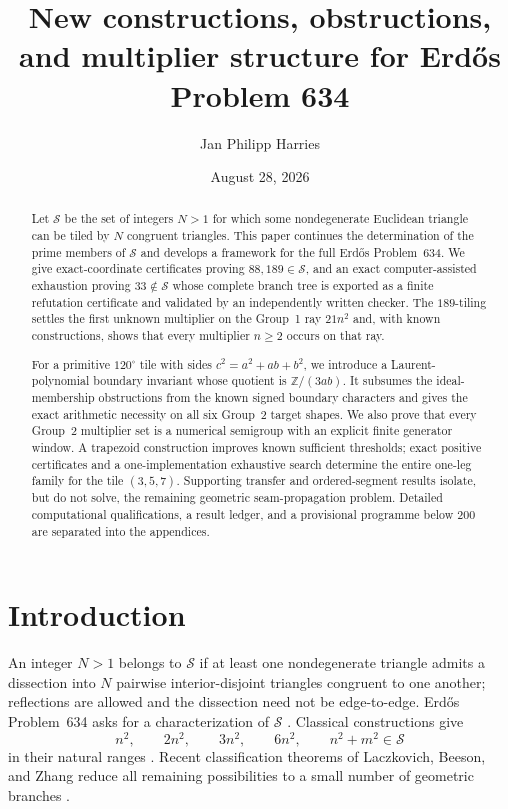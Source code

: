 \documentclass[11pt]{amsart}
\title[Progress toward Erd\H{o}s Problem 634]{New constructions, obstructions, and multiplier
structure for Erd\H{o}s Problem 634}
\author{Jan Philipp Harries}
\date{August 28, 2026}
\theoremstyle{definition}
\theoremstyle{remark}
\newcommand{\Z}{\mathbb Z}
\newcommand{\Sset}{\mathcal S}
\begin{document}
\begin{abstract}
Let $\Sset$ be the set of integers $N>1$ for which some nondegenerate
Euclidean triangle can be tiled by $N$ congruent triangles.  This paper
continues the determination of the prime members of $\Sset$ and develops a
framework for the full Erd\H{o}s Problem~634.  We give exact-coordinate
certificates proving $88,189\in\Sset$, and an
exact computer-assisted exhaustion proving $33\notin\Sset$ whose complete
branch tree is exported as a finite refutation certificate and validated by
an independently written checker.  The $189$-tiling settles the first unknown
multiplier on the Group~1 ray $21n^2$ and, with known constructions, shows that
every multiplier $n\ge2$ occurs on that ray.

For a primitive $120^\circ$ tile with sides
$c^2=a^2+ab+b^2$, we introduce a Laurent-polynomial boundary invariant whose
quotient is $\Z/(3ab)$.  It subsumes the ideal-membership obstructions from
the known signed boundary characters and gives the exact arithmetic necessity
on all six Group~2 target shapes.  We
also prove that every Group~2 multiplier set is a numerical semigroup with an
explicit finite generator window.  A trapezoid construction improves
known sufficient thresholds; exact positive certificates and a
one-implementation exhaustive search determine the entire one-leg family for
the tile $(3,5,7)$.  Supporting transfer and ordered-segment results isolate,
but do not solve, the remaining geometric seam-propagation problem.  Detailed
computational qualifications, a result ledger, and a provisional programme
below $200$ are separated into the appendices.
\end{abstract}

\maketitle

\section{Introduction}\label{sec:intro}

An integer $N>1$ belongs to $\Sset$ if at least one nondegenerate triangle
admits a dissection into $N$ pairwise interior-disjoint triangles congruent to
one another; reflections are allowed and the dissection need not be
edge-to-edge.  Erd\H{o}s Problem~634 asks for a characterization of $\Sset$
\cite{EP634,Soifer09}.  Classical constructions give
\[
 n^2,\qquad 2n^2,\qquad 3n^2,\qquad 6n^2,\qquad n^2+m^2\in\Sset
\]
in their natural ranges \cite{SWW91,Soifer09}.  Recent classification theorems
of Laczkovich, Beeson, and Zhang reduce all remaining possibilities to a small
number of geometric branches \cite{Lacz95,Lacz12,BLZ633,BZRat}.
\end{document}
